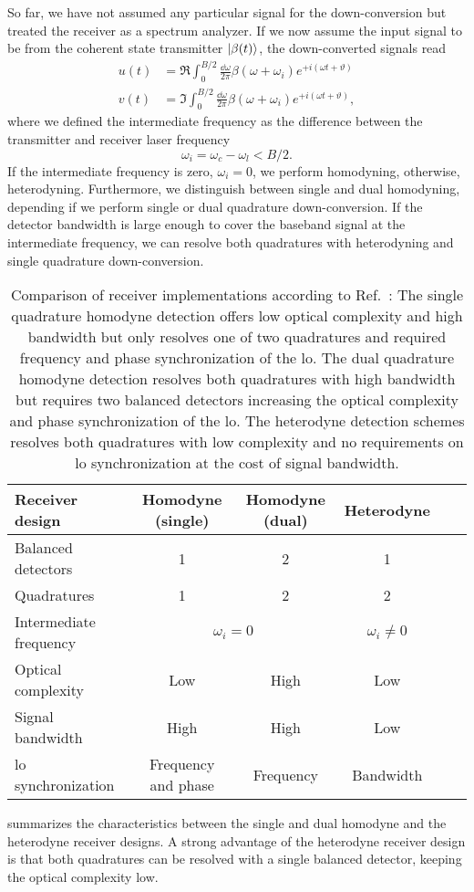 So far, we have not assumed any particular signal for the down-conversion but treated the receiver as a spectrum analyzer.
If we now assume the input signal to be from the coherent state transmitter $\lvert\beta(t)\rangle$, the down-converted signals read
\begin{align}
	u(t)
	&=
	\Re
	\int_0^{B/2}\frac{\dd{\omega}}{2\pi}
	\beta(\omega+\omega_i)
	e^{+i(\omega t+\vartheta)}
	\\
	v(t)
	&=
	\Im
	\int_0^{B/2}\frac{\dd{\omega}}{2\pi}
	\beta(\omega+\omega_i)
	e^{+i(\omega t+\vartheta)}
	,
\end{align}
where we defined the intermediate frequency as the difference between the transmitter and receiver laser frequency
\begin{equation}
	\omega_i
	=
	\omega_c-\omega_l
	<
	B/2
	.
\end{equation}
If the intermediate frequency is zero, $\omega_i=0$, we perform homodyning, otherwise, heterodyning.
Furthermore, we distinguish between single and dual homodyning, depending if we perform single or dual quadrature down-conversion.
If the detector bandwidth is large enough to cover the baseband signal at the intermediate frequency, we can resolve both quadratures with heterodyning and single quadrature down-conversion.
\begin{table}[htb]
  \centering
  \begin{tabular}{lccccc}
    \toprule
    Receiver design & Homodyne (single) & Homodyne (dual) & Heterodyne \\
    \midrule
    Balanced detectors & \num{1} & \num{2} & \num{1} \\
    Quadratures & \num{1} & \num{2} & \num{2} \\
    Intermediate frequency & \multicolumn{2}{c}{$\omega_i=0$} & $\omega_i\neq 0$ \\
    Optical complexity & Low & High & Low \\
    Signal bandwidth & High & High & Low \\
    \gls{lo} synchronization & Frequency and phase & Frequency & Bandwidth \\
    \bottomrule
  \end{tabular}
  \caption{Comparison of receiver implementations according to Ref.~\cite{Brunner2017}: The single quadrature homodyne detection offers low optical complexity and high bandwidth but only resolves one of two quadratures and required frequency and phase synchronization of the \gls{lo}. The dual quadrature homodyne detection resolves both quadratures with high bandwidth but requires two balanced detectors increasing the optical complexity and phase synchronization of the \gls{lo}. The heterodyne detection schemes resolves both quadratures with low complexity and no requirements on \gls{lo} synchronization at the cost of signal bandwidth.}\label{tab:receivers}
\end{table}
 summarizes the characteristics between the single and dual homodyne and the heterodyne receiver designs.
A strong advantage of the heterodyne receiver design is that both quadratures can be resolved with a single balanced detector, keeping the optical complexity low.

